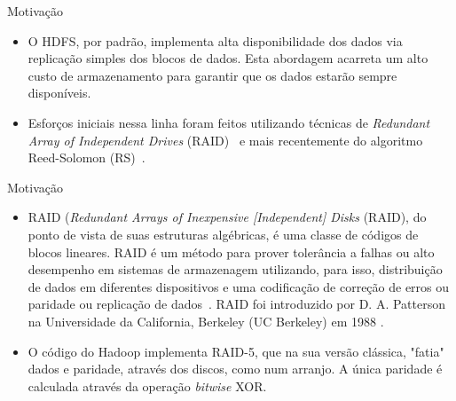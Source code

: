   \begin{frame}{Motivação}
     \begin{itemize}
      \item O HDFS, por padrão, implementa alta disponibilidade dos dados via replicação simples dos blocos de dados. Esta abordagem acarreta um alto custo de armazenamento para garantir que os dados estarão sempre disponíveis.
      \item Esforços iniciais nessa linha foram feitos utilizando técnicas de \emph{Redundant Array of Independent Drives} (RAID)~\cite{HDFS-503:2010,Patterson:1988} e mais recentemente do algoritmo Reed-Solomon (RS)~\cite{MR-1969:2010}.
     \end{itemize}
  \end{frame}


  \begin{frame}{Motivação}
     \begin{itemize}
        \item RAID (\emph{Redundant Arrays of Inexpensive [Independent] Disks} (RAID), do ponto de vista de suas estruturas algébricas, é uma classe de códigos de blocos lineares. RAID é um método para prover tolerância a falhas ou alto desempenho em sistemas de armazenagem utilizando, para isso, distribuição de dados em diferentes dispositivos e uma codificação de correção de erros ou paridade ou replicação de dados~\cite{Ramakrishnan:2003}. RAID foi introduzido por D. A. Patterson na Universidade da California, Berkeley (UC Berkeley) em 1988 \cite{Patterson:1988}.
         \item O código do Hadoop implementa RAID-5, que na sua versão clássica, "fatia" dados e paridade, através dos discos, como num arranjo. A única paridade é calculada através da operação \emph{bitwise} XOR. 
     \end{itemize}
  \end{frame}

